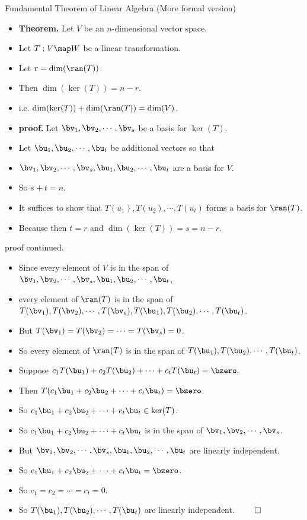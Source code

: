 \documentclass{beamer}
\begin{document}
\begin{frame}{Fundamental Theorem of Linear Algebra (More formal version)}
\begin{itemize}
\item \textbf{Theorem.} Let $V$ be an $n$-dimensional vector space.
\item Let $T:V\map W$ be a linear transformation.
\item Let $r=\dim(\ran(T))$.
\item Then $\dim(\ker(T)) = n - r$.
\item i.e. $\dim(\ker(T)) + \dim(\ran(T)) = \dim(V)$.
\item \textbf{proof.} Let $\bv_1,\bv_2,\cdots,\bv_s$ be a basis for $\ker(T)$.
\item Let $\bu_1,\bu_2,\cdots,\bu_t$ be additional vectors so that
\item $\bv_1,\bv_2,\cdots,\bv_s,\bu_1,\bu_2,\cdots,\bu_t$ are a basis for $V$.
\item So $s+t = n$.
\item It suffices to show that $T(u_1), T(u_2),\cdots, T(u_t)$ forms a basis for $\ran(T)$.
\item Because then $t=r$ and $\dim(\ker(T)) = s = n-r$.
\end{itemize}
\end{frame}

\begin{frame}{proof continued.}
\begin{itemize}
\item Since every element of $V$ is in the span of $\bv_1,\bv_2,\cdots,\bv_s,\bu_1,\bu_2,\cdots,\bu_t$,
\item every element of $\ran(T)$ is in the span of $T(\bv_1),T(\bv_2),\cdots,T(\bv_s), T(\bu_1),T(\bu_2),\cdots,T(\bu_t)$.
\item But $T(\bv_1) = T(\bv_2) = \cdots = T(\bv_s) = 0$.
\item So every element of $\ran(T)$ is in the span of $T(\bu_1),T(\bu_2),\cdots,T(\bu_t)$.
\item Suppose $c_1 T(\bu_1) + c_2 T(\bu_2) + \cdots + c_t T(\bu_t) = \bzero.$
\item Then $T(c_1\bu_1 + c_2 \bu_2 + \cdots + c_t\bu_t) = \bzero$.
\item So $c_1\bu_1 + c_2 \bu_2 + \cdots + c_t\bu_t \in \ker(T)$.
\item So $c_1\bu_1 + c_2 \bu_2 + \cdots + c_t\bu_t$ is in the span of $\bv_1,\bv_2,\cdots,\bv_s$.
\item But $\bv_1,\bv_2,\cdots,\bv_s,\bu_1,\bu_2,\cdots,\bu_t$ are linearly independent.
\item So $c_1\bu_1 + c_2 \bu_2 + \cdots + c_t\bu_t = \bzero$.
\item So $c_1 = c_2 = \cdots = c_t = 0$.
\item So $T(\bu_1), T(\bu_2),\cdots, T(\bu_t)$  are linearly independent. $\qed$
\end{itemize}
\end{frame}
\end{document}
